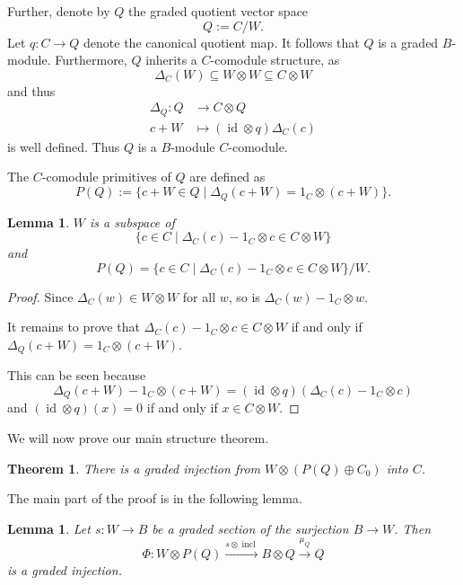 \documentclass[11pt,letterpaper]{amsart}
\numberwithin{theoremcounter}{section}
\newtheorem{theorem}[theoremauto]{Theorem}
\newtheorem{lemma}[lemmaauto]{Lemma}
\theoremstyle{definition}
\theoremstyle{remark}
\DeclareMathOperator{\id}{id}
\begin{document}
Further, denote by $Q$ the graded quotient vector space
\[ Q:= C/W.\]
Let $q\colon C \to Q$ denote the canonical quotient map.
It follows that $Q$ is a graded $B$-module. Furthermore, $Q$ inherits a $C$-comodule structure, as
\[ \Delta_C( W) \subseteq W \otimes W \subseteq C \otimes W\]
and thus
\begin{align*} \Delta_Q\colon Q &\longrightarrow C \otimes Q  \\
c + W &\longmapsto (\id \otimes q) \Delta_C(c)
\end{align*}
is well defined. Thus $Q$ is a $B$-module $C$-comodule.

The $C$-comodule primitives of $Q$ are defined as
\[P(Q) := \{ c+W\in Q \mid \Delta_Q(c+W) = 1_C\otimes (c+W)\}.\]

\begin{lemma}
    $W$ is a subspace of
    \[ \{ c\in C \mid \Delta_C(c) - 1_C \otimes c \in C \otimes W\}\]
    and 
    \[ P(Q) = \{ c\in C \mid \Delta_C(c) - 1_C \otimes c \in C \otimes W\}/W.\]
\end{lemma}



\begin{proof}
    Since $\Delta_C(w) \in W \otimes W$ for all $w$, so is $\Delta_C(w) - 1_C \otimes w$.

    It remains to prove that $\Delta_C(c) -1_C \otimes c \in C \otimes W$ if and only if $\Delta_Q(c+W) = 1_C \otimes (c+W)$.

    This can be seen because 
    \[ \Delta_Q(c+W) - 1_C \otimes (c + W) = (\id \otimes q)(\Delta_C(c) - 1_C \otimes c) \]
    and $(\id \otimes q)(x) =0 $ if and only if $x\in C \otimes W$.
\end{proof}

We will now prove our main structure theorem.

\begin{theorem} \label{FreenessModulecoAlgebra}
    There is a graded injection from $W \otimes (P(Q) \oplus C_0)$ into $C$.
\end{theorem}

The main part of the proof is in the following lemma.

\begin{lemma}
    Let $s\colon W \to B$ be a graded section of the surjection $B \to W$. Then
    \[ \Phi\colon W \otimes P(Q) \xrightarrow{s \otimes \operatorname{incl}} B \otimes Q\stackrel{\mu_Q}{\longrightarrow} Q \]
    is a graded injection.
\end{lemma}
\end{document}
